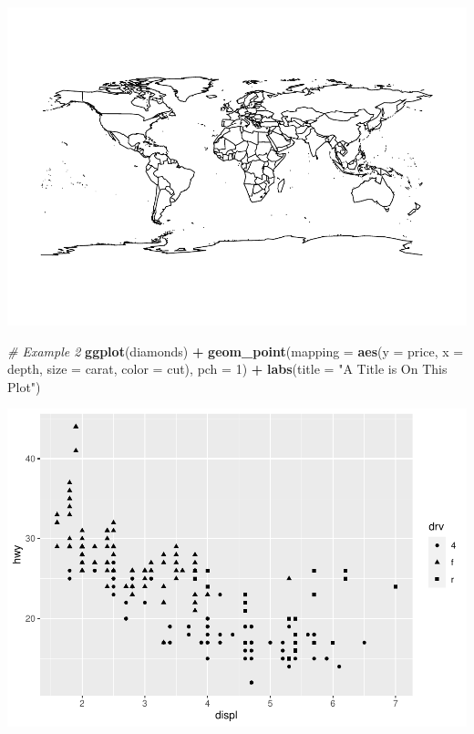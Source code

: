 \documentclass[
]{book}
\newenvironment{Shaded}{\begin{snugshade}}{\end{snugshade}}
\newcommand{\CommentTok}[1]{\textcolor[rgb]{0.56,0.35,0.01}{\textit{#1}}}
\newcommand{\DataTypeTok}[1]{\textcolor[rgb]{0.13,0.29,0.53}{#1}}
\newcommand{\DecValTok}[1]{\textcolor[rgb]{0.00,0.00,0.81}{#1}}
\newcommand{\KeywordTok}[1]{\textcolor[rgb]{0.13,0.29,0.53}{\textbf{#1}}}
\newcommand{\NormalTok}[1]{#1}
\newcommand{\OperatorTok}[1]{\textcolor[rgb]{0.81,0.36,0.00}{\textbf{#1}}}
\newcommand{\StringTok}[1]{\textcolor[rgb]{0.31,0.60,0.02}{#1}}
\begin{document}
\includegraphics{_main_files/figure-latex/unnamed-chunk-255-1.pdf}

\begin{Shaded}
\begin{Highlighting}[]
\CommentTok{# Example 2}
\KeywordTok{ggplot}\NormalTok{(diamonds) }\OperatorTok{+}\StringTok{ }\KeywordTok{geom_point}\NormalTok{(}\DataTypeTok{mapping =} \KeywordTok{aes}\NormalTok{(}\DataTypeTok{y =}\NormalTok{ price, }\DataTypeTok{x =}\NormalTok{ depth,}
    \DataTypeTok{size =}\NormalTok{ carat, }\DataTypeTok{color =}\NormalTok{ cut), }\DataTypeTok{pch =} \DecValTok{1}\NormalTok{) }\OperatorTok{+}\StringTok{ }\KeywordTok{labs}\NormalTok{(}\DataTypeTok{title =} \StringTok{"A Title is On This Plot"}\NormalTok{)}
\end{Highlighting}
\end{Shaded}

\includegraphics{_main_files/figure-latex/unnamed-chunk-255-2.pdf}
\end{document}
